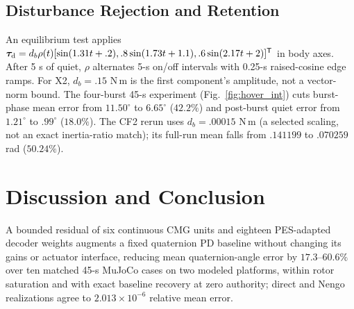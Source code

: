 \documentclass[letterpaper, 10 pt, conference]{ieeeconf}
\newcommand{\T}{^{\mathsf T}}
\begin{document}
\subsection{Disturbance Rejection and Retention}
\label{sec:disturbance}
An equilibrium test applies
$\bm\tau_{\rm d}=d_b\rho(t)[\sin(1.31t+.2),\allowbreak
.8\sin(1.73t+1.1),\allowbreak.6\sin(2.17t+2)]\T$ in body axes.
After 5 s of quiet, $\rho$ alternates 5-s on/off intervals with 0.25-s
raised-cosine edge ramps. For X2, $d_b=.15$ N\,m is the first component's
amplitude, not a vector-norm bound.
The four-burst 45-s experiment (Fig.~\ref{fig:hover_int}) cuts burst-phase
mean error from $11.50^\circ$ to $6.65^\circ$ ($42.2\%$) and post-burst
quiet error from $1.21^\circ$ to $.99^\circ$ ($18.0\%$).
The CF2 rerun uses $d_b=.00015$ N\,m (a selected scaling, not an exact
inertia-ratio match); its full-run mean falls from
$.141199$ to $.070259$ rad ($50.24\%$).




\section{Discussion and Conclusion}
\label{sec:conclusion}
A bounded residual of six continuous CMG units and eighteen PES-adapted decoder weights augments a fixed quaternion PD baseline without changing its gains or actuator interface, reducing mean quaternion-angle error by $17.3$--$60.6\%$ over ten matched 45-s MuJoCo cases on two modeled platforms, within rotor saturation and with exact baseline recovery at zero authority; direct and Nengo realizations agree to $2.013\times10^{-6}$ relative mean error.
\end{document}
